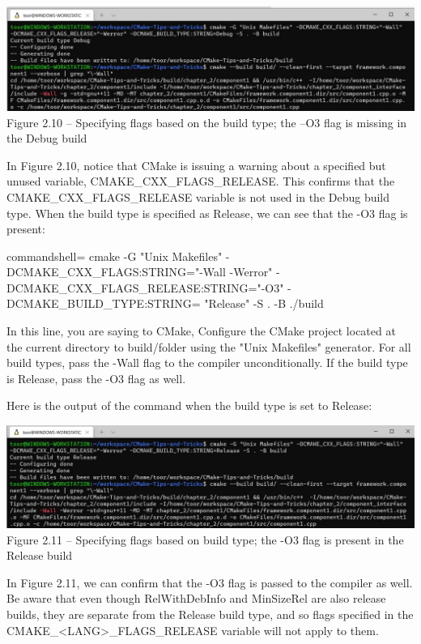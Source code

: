 \begin{center}
\includegraphics[width=1.\textwidth]{content/1/chapter2/images/10.jpg}\\
Figure 2.10 – Specifying flags based on the build type; the –O3 flag is missing in the Debug build
\end{center}

In Figure 2.10, notice that CMake is issuing a warning about a specified but unused variable, CMAKE\_CXX\_FLAGS\_RELEASE. This confirms that the CMAKE\_CXX\_FLAGS\_RELEASE variable is not used in the Debug build type. When the build type is specified as Release, we can see that the -O3 flag is present:

\begin{tcblisting}{commandshell={}}
cmake -G "Unix Makefiles" -DCMAKE_CXX_FLAGS:STRING="-Wall
-Werror" -DCMAKE_CXX_FLAGS_RELEASE:STRING="-O3"
-DCMAKE_BUILD_TYPE:STRING= "Release" -S . -B ./build
\end{tcblisting}

In this line, you are saying to CMake, Configure the CMake project located at the current directory to build/folder using the "Unix Makefiles" generator. For all build types, pass the -Wall flag to the compiler unconditionally. If the build type is Release, pass the -O3 flag as well.

Here is the output of the command when the build type is set to Release:

\begin{center}
\includegraphics[width=1.\textwidth]{content/1/chapter2/images/11.jpg}\\
Figure 2.11 – Specifying flags based on build type; the -O3 flag is present in the Release build
\end{center}

In Figure 2.11, we can confirm that the -O3 flag is passed to the compiler as well. Be aware that even though RelWithDebInfo and MinSizeRel are also release builds, they are separate from the Release build type, and so flags specified in the CMAKE\_<LANG>\_FLAGS\_RELEASE variable will not apply to them.

